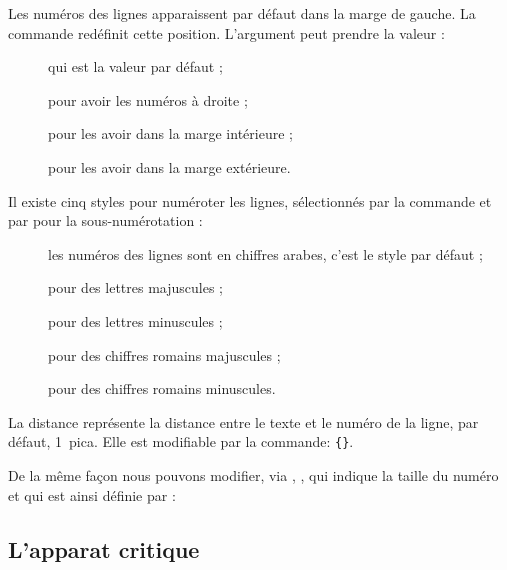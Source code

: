 Les numéros des lignes apparaissent  par défaut dans la marge de gauche. La commande  redéfinit cette position. L'argument peut prendre la valeur :

\begin{description}
\item[] qui est la valeur par défaut ;
\item[] pour avoir les numéros  à droite ;
\item[] pour les avoir dans la marge intérieure ;
\item[] pour les avoir dans la marge extérieure.
\end{description}

Il existe   cinq styles pour numéroter les lignes, sélectionnés par la commande 
 et par  pour la sous-numérotation :

\begin{description} 
\item[] les numéros des lignes sont en chiffres arabes, c'est le style par défaut ; 
\item[] pour des lettres majuscules ;
\item[] pour des lettres minuscules ;
\item[] pour des chiffres romains majuscules ; 
\item[] pour des chiffres romains minuscules. 
\end{description}

La distance  représente la distance entre le texte et le numéro de la ligne, par défaut, 1~pica. 
Elle est  modifiable par la commande:
\verb|{|\verb|}|. 

De la même façon nous pouvons modifier, via , , qui indique la taille du numéro et qui est ainsi définie par :

\begin{latexcode}
\newcommand{\numlabfont}{\normalfont\scriptsize}
\end{latexcode}
 

\subsection{L'apparat critique}

